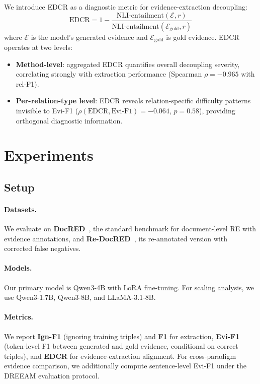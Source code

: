 \documentclass[11pt,a4paper]{article}
\begin{document}
We introduce EDCR as a diagnostic metric for evidence-extraction decoupling:
\begin{equation}
\text{EDCR} = 1 - \frac{\text{NLI-entailment}(\mathcal{E}, r)}{\text{NLI-entailment}(\mathcal{E}_{\text{gold}}, r)}
\end{equation}
where $\mathcal{E}$ is the model's generated evidence and $\mathcal{E}_{\text{gold}}$ is gold evidence.
EDCR operates at two levels:
\begin{itemize}
\item \textbf{Method-level}: aggregated EDCR quantifies overall decoupling severity, correlating strongly with extraction performance (Spearman $\rho = -0.965$ with rel-F1).
\item \textbf{Per-relation-type level}: EDCR reveals relation-specific difficulty patterns invisible to Evi-F1 ($\rho(\text{EDCR}, \text{Evi-F1}) = -0.064$, $p=0.58$), providing orthogonal diagnostic information.
\end{itemize}

\section{Experiments}

\subsection{Setup}

\paragraph{Datasets.}
We evaluate on \textbf{DocRED}~\cite{yao2019docred}, the standard benchmark for document-level RE with evidence annotations, and \textbf{Re-DocRED}~\cite{tan2022revisiting}, its re-annotated version with corrected false negatives.

\paragraph{Models.}
Our primary model is Qwen3-4B with LoRA fine-tuning.
For scaling analysis, we use Qwen3-1.7B, Qwen3-8B, and LLaMA-3.1-8B.

\paragraph{Metrics.}
We report \textbf{Ign-F1} (ignoring training triples) and \textbf{F1} for extraction, \textbf{Evi-F1} (token-level F1 between generated and gold evidence, conditional on correct triples), and \textbf{EDCR} for evidence-extraction alignment.
For cross-paradigm evidence comparison, we additionally compute sentence-level Evi-F1 under the DREEAM evaluation protocol.
\end{document}
